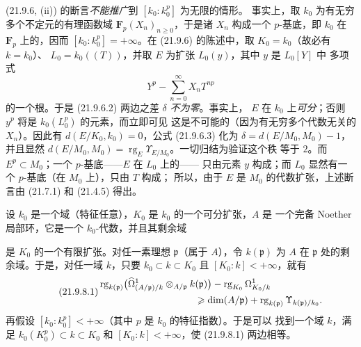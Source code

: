 \begin{remark}[21.9.7]
\label{0.21.9.7-fr}
(21.9.6, (ii)) 的断言\emph{不能推广}到 $[k_0:k_0^p]$ 为无限的情形。
事实上，取 $k_0$ 为有无穷多个不定元的有理函数域
$\mathbf F_p(X_n)_{n\geqslant0}$，于是诸 $X_n$ 构成一个 $p$-基底，即
$k_0$ 在 $\mathbf F_p$ 上的，因而 $[k_0:k_0^p]=+\infty$。在
(21.9.6) 的陈述中，取 $K_0=k_0$（故必有 $k=k_0$）、
$L_0=k_0((T))$，并取 $E$ 为扩张 $L_0(y)$，其中 $y$ 是 $L_0[Y]$ 中
多项式
\[
  Y^p-\sum_{n=0}^{\infty}X_nT^{np}
\]
的一个根。于是 (21.9.6.2) 两边之差 $\delta$ \emph{不为零}。事实上，
$E$ 在 $k_0$ 上\emph{可分}；否则 $y^p$ 将是 $k_0(L_0^p)$ 的元素，而立即可见
这是不可能的（因为有无穷多个代数无关的 $X_n$）。因此有
$d(E/K_0,k_0)=0$，公式 (21.9.6.3) 化为
$\delta=d(E/M_0,M_0)-1$，并且显然
$d(E/M_0,M_0)=\operatorname{rg}_E\Upsilon_{E/M_0}$。一切归结为验证这个秩
等于 $2$。而 $E^p\subset M_0$；一个 $p$-基底——$E$ 在 $L_0$ 上的——
只由元素 $y$ 构成；而 $L_0$ 显然有一个 $p$-基底（在 $M_0$ 上），只由
$T$ 构成；
所以，由于 $E$ 是 $M_0$ 的代数扩张，上述断言由 (21.7.1) 和 (21.4.5)
得出。
\end{remark}

\begin{proposition}[21.9.8]
\label{0.21.9.8-fr}
设 $k_0$ 是一个域（特征任意），$K_0$ 是 $k_0$ 的一个可分扩张，$A$ 是
一个完备 Noether 局部环，它是一个 $k_0$-代数，并且其剩余域

是 $K_0$ 的一个有限扩张。对任一素理想 $\mathfrak p$（属于 $A$），令
$k(\mathfrak p)$ 为
$A$ 在 $\mathfrak p$ 处的剩余域。于是，对任一域 $k$，只要
$k_0\subset k\subset K_0$ 且 $[K_0:k]<+\infty$，就有
\begin{equation}
\tag{21.9.8.1}
\label{0.21.9.8.1-fr}
\begin{split}
  &\operatorname{rg}_{k(\mathfrak p)}
    \bigl(\widehat\Omega^1_{(A/\mathfrak p)/k}
      \otimes_{A/\mathfrak p}k(\mathfrak p)\bigr)
    -\operatorname{rg}_{K_0}\Omega^1_{K_0/k}\\
  &\hspace{35mm}\geqslant
    \dim(A/\mathfrak p)
    +\operatorname{rg}_{k(\mathfrak p)}\Upsilon_{k(\mathfrak p)/k_0}.
\end{split}
\end{equation}
再假设 $[k_0:k_0^p]<+\infty$（其中 $p$ 是 $k_0$ 的特征指数）。于是可以
找到一个域 $k$，满足 $k_0(K_0^p)\subset k\subset K_0$ 和
$[K_0:k]<+\infty$，使 (21.9.8.1) 两边相等。
\end{proposition}

